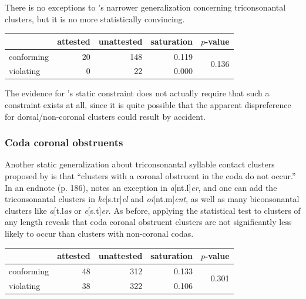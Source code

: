 There is no exceptions to \citeauthor{Pierrehumbert1994}'s narrower generalization concerning triconsonantal clusters, but it is no more statistically convincing. 

\begin{example}
\begin{tabular}{l r r r r}
\toprule
           & attested & unattested & saturation & $p$-value              \\
\midrule
conforming & 20       & 148        & 0.119      & \multirow{2}{*}{0.136} \\
violating  &  0       &  22        & 0.000                               \\
\bottomrule
\end{tabular}
\end{example}

\noindent The evidence for \citeauthor{Pierrehumbert1994}'s static constraint does not actually require that such a constraint exists at all, since it is quite possible that the apparent dispreference for dorsal/non-coronal clusters could result by accident.

\subsubsection{Coda coronal obstruents}

Another static generalization about triconsonantal syllable contact clusters proposed by \citet[][175]{Pierrehumbert1994} is that  ``clusters with a coronal obstruent in the coda do not occur.'' In an endnote (p. 186), \citet{Pierrehumbert1994} notes an exception in \emph{a}[nt.l]\emph{er}, and one can add the triconsonantal clusters in \emph{ke}[s.tr]\emph{el} and \emph{oi}[nt.m]\emph{ent}, as well as many biconsonantal clusters like \emph{a}[t.l\emph{as} or \emph{e}[s.t]\emph{er}. As before, applying the statistical test to clusters of any length reveals that coda coronal obstruent clusters are not significantly less likely to occur than clusters with non-coronal codas. 

\begin{example}
\begin{tabular}{l r r r r}
\toprule
           & attested & unattested & saturation & $p$-value              \\
\midrule
conforming & 48       & 312        & 0.133      & \multirow{2}{*}{0.301} \\
violating  & 38       & 322        & 0.106                               \\
\bottomrule
\end{tabular}
\end{example}

